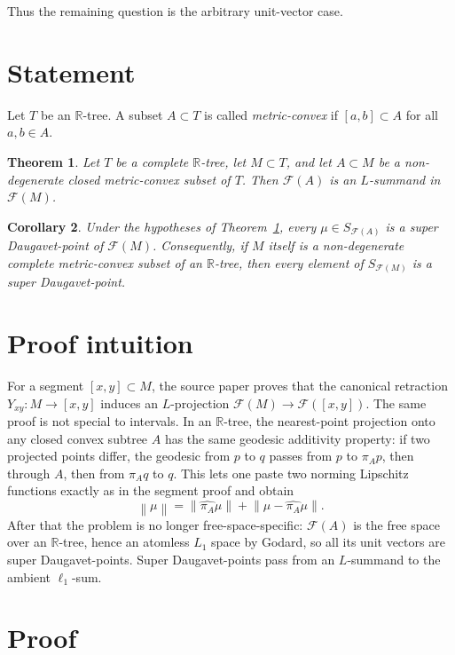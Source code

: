 \documentclass[11pt]{article}
\newtheorem{theorem}{Theorem}[section]
\newtheorem{corollary}[theorem]{Corollary}
\theoremstyle{definition}
\theoremstyle{remark}
\newcommand{\R}{\mathbb R}
\newcommand{\F}{\mathcal F}
\newcommand{\norm}[1]{\left\lVert #1 \right\rVert}
\begin{document}
Thus the remaining question is the arbitrary unit-vector case.

\section{Statement}

Let $T$ be an $\R$-tree.  A subset $A\subset T$ is called
\emph{metric-convex} if $[a,b]\subset A$ for all $a,b\in A$.

\begin{theorem}\label{thm:l-summand}
Let $T$ be a complete $\R$-tree, let $M\subset T$, and let
$A\subset M$ be a non-degenerate closed metric-convex subset of $T$.
Then $\F(A)$ is an $L$-summand in $\F(M)$.
\end{theorem}

\begin{corollary}\label{cor:super}
Under the hypotheses of Theorem~\ref{thm:l-summand}, every
$\mu\in S_{\F(A)}$ is a super Daugavet-point of $\F(M)$.
Consequently, if $M$ itself is a non-degenerate complete metric-convex
subset of an $\R$-tree, then every element of $S_{\F(M)}$ is a super
Daugavet-point.
\end{corollary}

\section{Proof intuition}

For a segment $[x,y]\subset M$, the source paper proves that the canonical
retraction $Y_{xy}:M\to[x,y]$ induces an $L$-projection
$\F(M)\to\F([x,y])$.  The same proof is not special to intervals.  In an
$\R$-tree, the nearest-point projection onto any closed convex subtree $A$
has the same geodesic additivity property: if two projected points differ,
the geodesic from $p$ to $q$ passes from $p$ to $\pi_Ap$, then through $A$,
then from $\pi_Aq$ to $q$.  This lets one paste two norming Lipschitz
functions exactly as in the segment proof and obtain
\[
  \norm{\mu}=\norm{\widehat{\pi_A}\mu}+\norm{\mu-\widehat{\pi_A}\mu}.
\]
After that the problem is no longer free-space-specific: $\F(A)$ is the free
space over an $\R$-tree, hence an atomless $L_1$ space by Godard, so all its
unit vectors are super Daugavet-points.  Super Daugavet-points pass from an
$L$-summand to the ambient $\ell_1$-sum.

\section{Proof}
\end{document}
